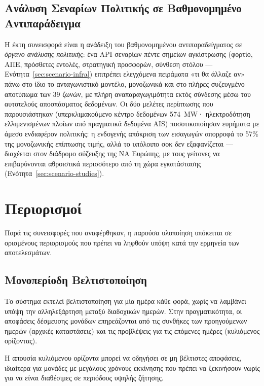 \subsection{Ανάλυση Σεναρίων Πολιτικής σε Βαθμονομημένο Αντιπαράδειγμα}
\label{subsec:scenario-contribution}

Η έκτη συνεισφορά είναι η ανάδειξη του βαθμονομημένου αντιπαραδείγματος σε \emph{όργανο ανάλυσης πολιτικής}: ένα API σεναρίων πέντε σημείων αγκίστρωσης (φορτίο, ΑΠΕ, πρόσθετες εντολές, στρατηγική προσφορών, σύνθεση στόλου --- Ενότητα~\ref{sec:scenario-infra}) επιτρέπει ελεγχόμενα πειράματα «τι θα άλλαζε αν» πάνω στο ίδιο το ανταγωνιστικό μοντέλο, μονοζωνικά και στο πλήρες συζευγμένο αποτύπωμα των 39 ζωνών, με πλήρη αναπαραγωγιμότητα εκτός σύνδεσης μέσω του αυτοτελούς αποσπάσματος δεδομένων. Οι δύο μελέτες περίπτωσης που παρουσιάστηκαν (υπερκλιμακούμενο κέντρο δεδομένων 574~MW· ηλεκτροδότηση ελλιμενισμένων πλοίων από πραγματικά δεδομένα AIS) ποσοτικοποίησαν ευρήματα με άμεσο ενδιαφέρον πολιτικής: η ενδογενής απόκριση των εισαγωγών απορροφά το 57\% της μονοζωνικής επίπτωσης τιμής, αλλά το υπόλοιπο σοκ δεν εξαφανίζεται --- διαχέεται στον διάδρομο σύζευξης της ΝΑ Ευρώπης, με τους γείτονες να επιβαρύνονται αθροιστικά περισσότερο από τη χώρα εγκατάστασης (Ενότητα~\ref{sec:scenario-studies}).


\section{Περιορισμοί}
\label{sec:limitations}

Παρά τις συνεισφορές που αναφέρθηκαν, η παρούσα υλοποίηση υπόκειται σε ορισμένους περιορισμούς που πρέπει να ληφθούν υπόψη κατά την ερμηνεία των αποτελεσμάτων.

\subsection{Μονοπερίοδη Βελτιστοποίηση}
\label{subsec:single-period-limitation}

Το σύστημα εκτελεί βελτιστοποίηση για μία ημέρα κάθε φορά, χωρίς να λαμβάνει υπόψη την αλληλεξάρτηση μεταξύ διαδοχικών ημερών. Στην πραγματικότητα, οι αποφάσεις δέσμευσης μονάδων επηρεάζονται από τις συνθήκες των προηγούμενων ημερών (αρχικές καταστάσεις) και τις προβλέψεις για τις επόμενες ημέρες (κυλιόμενος ορίζοντας).

Η απουσία κυλιόμενου ορίζοντα μπορεί να οδηγήσει σε μη βέλτιστες αποφάσεις, ιδιαίτερα για μονάδες με μεγάλους χρόνους εκκίνησης που πρέπει να ξεκινήσουν νωρίς για να είναι διαθέσιμες σε περιόδους υψηλής ζήτησης.


